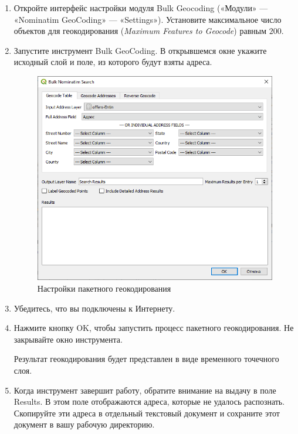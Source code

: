 \documentclass[
  12pt,
]{book}
\begin{document}
\begin{enumerate}
\def\labelenumi{\arabic{enumi}.}
\item
  Откройте интерфейс настройки модуля Bulk Geocoding («Модули» --- «Nominatim GeoCoding» --- «Settings»). Установите максимальное число объектов для геокодирования (\emph{Maximum Features to Geocode}) равным \(200\).
\item
  Запустите инструмент Bulk GeoCoding. В открывшемся окне укажите исходный слой и поле, из которого будут взяты адреса.

  \begin{figure}
  \centering
  \includegraphics{images/Ex08_Geocoding/coding01.png}
  \caption{Настройки пакетного геокодирования}
  \end{figure}
\item
  Убедитесь, что вы подключены к Интернету.
\item
  Нажмите кнопку OK, чтобы запустить процесс пакетного геокодирования. Не закрывайте окно инструмента.

  Результат геокодирования будет представлен в виде временного точечного слоя.
\item
  Когда инструмент завершит работу, обратите внимание на выдачу в поле Results. В этом поле отображаются адреса, которые не удалось распознать. Скопируйте эти адреса в отдельный текстовый документ и сохраните этот документ в вашу рабочую директорию.


\end{enumerate}
\end{document}
